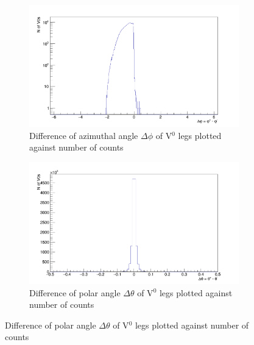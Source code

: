 \begin{figure}
\centering
\begin{subfigure}[h]{.4\linewidth}
\includegraphics[width=1.0\linewidth]{Figures/additionalV0cuts/DeltaPhi.png}
\caption{Difference of azimuthal angle $\Delta\phi$ of V$^0$ legs plotted against number of counts}
\label{fig:DPhi}
\end{subfigure}\hspace{1cm}%
\begin{subfigure}[h]{.4\linewidth}
\includegraphics[width=1.0\linewidth]{Figures/additionalV0cuts/DeltaTheta.png}
\caption{Difference of polar angle $\Delta\theta$ of V$^0$ legs plotted against number of counts}
\label{fig:DTheta}
\end{subfigure}

\vspace{0.7cm}


\end{figure}
